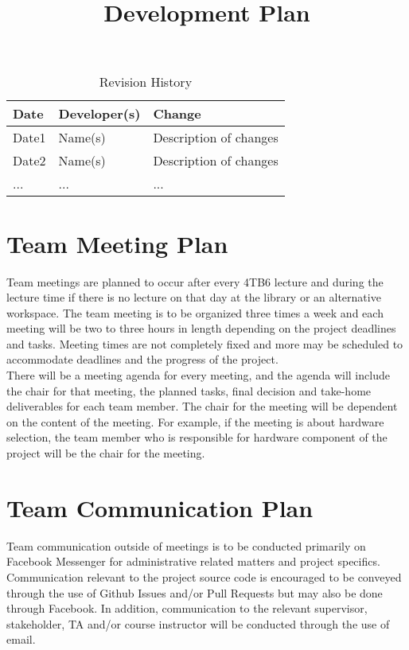 \documentclass{article}
\title{Development Plan\\\progname}
\author{\authname}
\date{}
\begin{document}
\begin{table}[H]
\caption{Revision History} \label{TblRevisionHistory}
\begin{tabularx}{\textwidth}{llX}
\toprule
\textbf{Date} & \textbf{Developer(s)} & \textbf{Change}\\
\midrule
Date1 & Name(s) & Description of changes\\
Date2 & Name(s) & Description of changes\\
... & ... & ...\\
\bottomrule
\end{tabularx}
\end{table}

\newpage

\maketitle


\section{Team Meeting Plan}

Team meetings are planned to occur after every 4TB6 lecture and during the lecture time if there is
no lecture on that day at the library or an alternative workspace. The team meeting is to be
organized three times a week and each meeting will be two to three hours in length depending on the
project deadlines and tasks. Meeting times are not completely fixed and more may be scheduled to accommodate
deadlines and the progress of the project.\\ There will be a meeting agenda for every meeting, and the agenda
will include the chair for that meeting, the planned tasks, final decision and take-home deliverables for
each team member. The chair for the meeting will be dependent on the content of the meeting. For example,
if the meeting is about hardware selection, the team member who is responsible for hardware component of the project
will be the chair for the meeting. 

\section{Team Communication Plan}

Team communication outside of meetings is to be conducted primarily on Facebook Messenger
for administrative related matters and project specifics. Communication relevant to the project
source code is encouraged to be conveyed through the use of Github Issues and\slash or Pull Requests
but may also be done through Facebook. In addition, communication to the relevant supervisor,
stakeholder, TA and\slash or course instructor will be conducted through the use of email.
\end{document}
